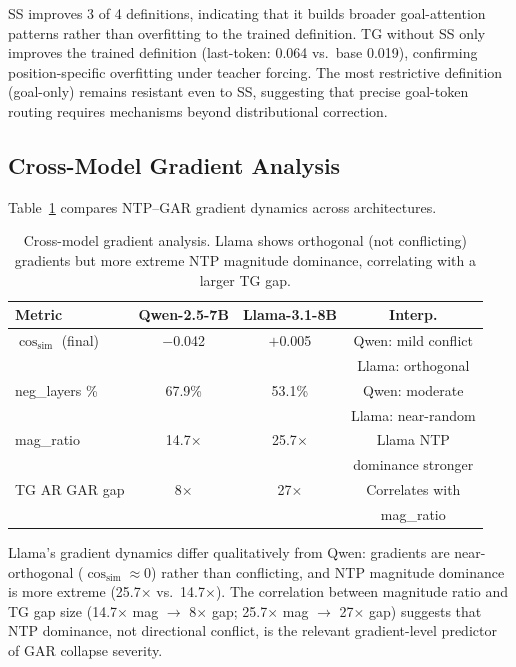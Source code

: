 \documentclass[11pt,a4paper]{article}
\begin{document}
SS improves 3 of 4 definitions, indicating that it builds broader goal-attention patterns rather than overfitting to the trained definition. TG without SS only improves the trained definition (last-token: 0.064 vs.\ base 0.019), confirming position-specific overfitting under teacher forcing. The most restrictive definition (goal-only) remains resistant even to SS, suggesting that precise goal-token routing requires mechanisms beyond distributional correction.

\subsection{Cross-Model Gradient Analysis}

Table~\ref{tab:grad_cross} compares NTP--GAR gradient dynamics across architectures.

\begin{table}[t]
\centering
\small
\caption{Cross-model gradient analysis. Llama shows orthogonal (not conflicting) gradients but more extreme NTP magnitude dominance, correlating with a larger TG gap.}
\label{tab:grad_cross}
\begin{tabular}{@{}lccc@{}}
\toprule
Metric & Qwen-2.5-7B & Llama-3.1-8B & Interp. \\
\midrule
$\cos_{\text{sim}}$ (final) & $-$0.042 & $+$0.005 & Qwen: mild conflict \\
 & & & Llama: orthogonal \\
neg\_layers \% & 67.9\% & 53.1\% & Qwen: moderate \\
 & & & Llama: near-random \\
mag\_ratio & 14.7$\times$ & 25.7$\times$ & Llama NTP \\
 & & & dominance stronger \\
TG AR GAR gap & 8$\times$ & 27$\times$ & Correlates with \\
 & & & mag\_ratio \\
\bottomrule
\end{tabular}
\end{table}

Llama's gradient dynamics differ qualitatively from Qwen: gradients are near-orthogonal ($\cos_{\text{sim}} \approx 0$) rather than conflicting, and NTP magnitude dominance is more extreme (25.7$\times$ vs.\ 14.7$\times$). The correlation between magnitude ratio and TG gap size (14.7$\times$ mag $\to$ 8$\times$ gap; 25.7$\times$ mag $\to$ 27$\times$ gap) suggests that NTP dominance, not directional conflict, is the relevant gradient-level predictor of GAR collapse severity.
\end{document}
